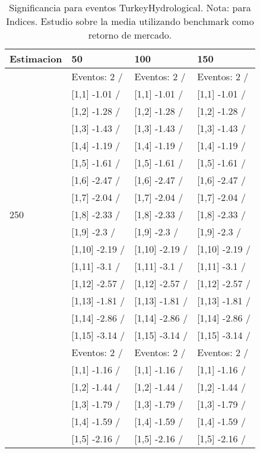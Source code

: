 \begin{table}

\caption{Significancia para eventos TurkeyHydrological. Nota: para Indices. Estudio sobre la media utilizando benchmark como retorno de mercado.}
\centering
\begin{tabular}[t]{llll}
\toprule
Estimacion & 50 & 100 & 150\\
\midrule
 & Eventos:  2 / & Eventos:  2 / & Eventos:  2 /\\
 & {}[1,1] -1.01  / & {}[1,1] -1.01  / & {}[1,1] -1.01  /\\
 & {}[1,2] -1.28  / & {}[1,2] -1.28  / & {}[1,2] -1.28  /\\
 & {}[1,3] -1.43  / & {}[1,3] -1.43  / & {}[1,3] -1.43  /\\
 & {}[1,4] -1.19  / & {}[1,4] -1.19  / & {}[1,4] -1.19  /\\
\addlinespace
 & {}[1,5] -1.61  / & {}[1,5] -1.61  / & {}[1,5] -1.61  /\\
 & {}[1,6] -2.47  / & {}[1,6] -2.47  / & {}[1,6] -2.47  /\\
 & {}[1,7] -2.04  / & {}[1,7] -2.04  / & {}[1,7] -2.04  /\\
250 & {}[1,8] -2.33  / & {}[1,8] -2.33  / & {}[1,8] -2.33  /\\
 & {}[1,9] -2.3  / & {}[1,9] -2.3  / & {}[1,9] -2.3  /\\
\addlinespace
 & {}[1,10] -2.19  / & {}[1,10] -2.19  / & {}[1,10] -2.19  /\\
 & {}[1,11] -3.1  / & {}[1,11] -3.1  / & {}[1,11] -3.1  /\\
 & {}[1,12] -2.57  / & {}[1,12] -2.57  / & {}[1,12] -2.57  /\\
 & {}[1,13] -1.81  / & {}[1,13] -1.81  / & {}[1,13] -1.81  /\\
 & {}[1,14] -2.86  / & {}[1,14] -2.86  / & {}[1,14] -2.86  /\\
\addlinespace
 & {}[1,15] -3.14  / & {}[1,15] -3.14  / & {}[1,15] -3.14  /\\
 & Eventos:  2 / & Eventos:  2 / & Eventos:  2 /\\
 & {}[1,1] -1.16  / & {}[1,1] -1.16  / & {}[1,1] -1.16  /\\
 & {}[1,2] -1.44  / & {}[1,2] -1.44  / & {}[1,2] -1.44  /\\
 & {}[1,3] -1.79  / & {}[1,3] -1.79  / & {}[1,3] -1.79  /\\
\addlinespace
 & {}[1,4] -1.59  / & {}[1,4] -1.59  / & {}[1,4] -1.59  /\\
 & {}[1,5] -2.16  / & {}[1,5] -2.16  / & {}[1,5] -2.16  /\\

\end{tabular}
\end{table}
